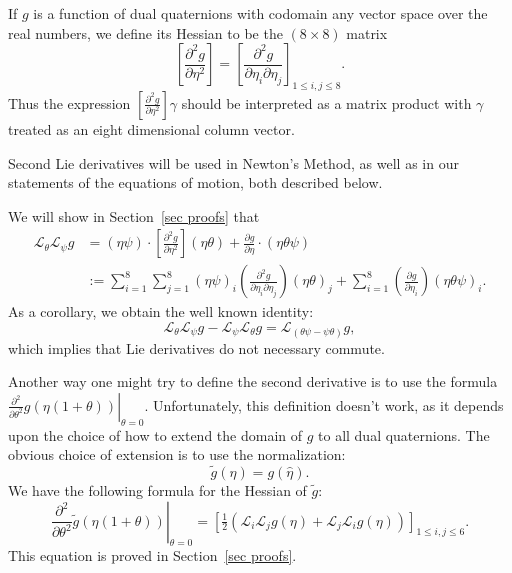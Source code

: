 \documentclass[reqno,12pt]{amsart}
\newcommand{\liederiv}{\mathcal L}
\begin{document}
If $g$ is a function of dual quaternions with codomain any vector space over the real numbers, we define its Hessian to be the $(8 \times 8)$ matrix
\begin{equation}
\left[\frac{\partial^2 g}{\partial \eta^2}\right] = \left[\frac{\partial^2 g}{\partial \eta_i\partial \eta_j}\right] _{ 1 \le i,j \le 8 }.
\end{equation}
Thus the expression $\left[\frac{\partial^2 g}{\partial \eta^2}\right] \gamma$ should be interpreted as a matrix product with $\gamma$ treated as an eight dimensional column vector.

Second Lie derivatives will be used in Newton's Method, as well as in our statements of the equations of motion, both described below.

We will show in Section~\ref{sec proofs} that
\begin{equation}
\label{second lie deriv}
\begin{aligned}
\liederiv_\theta \liederiv_\psi g &= (\eta \psi) \cdot \left[\frac{\partial^2 g}{\partial \eta^2}\right](\eta \theta) + \frac{\partial g}{\partial \eta} \cdot (\eta \theta \psi) \\
&:= \sum_{i=1}^8 \sum_{j=1}^8 (\eta \psi)_i \left(\frac{\partial^2 g}{\partial \eta_i \partial \eta_j}\right)(\eta \theta)_j + \sum_{i=1}^8 \left(\frac{\partial g}{\partial \eta_i}\right) (\eta \theta \psi)_i .
\end{aligned}
\end{equation}
As a corollary, we obtain the well known identity:
\begin{equation}
\label{lie bracket diff = diff lie bracket}
\liederiv_\theta \liederiv_\psi g - \liederiv_\psi \liederiv_\theta g = \liederiv_{(\theta\psi - \psi\theta)} g,
\end{equation}
which implies that Lie derivatives do not necessary commute.

Another way one might try to define the second derivative is to use the formula $\left.\frac {\partial^2}{\partial\theta^2} g(\eta(1+\theta)) \right | _{\theta=0}$.  Unfortunately, this definition doesn't work, as it depends upon the choice of how to extend the domain of $g$ to all dual quaternions.  The obvious choice of extension is to use the normalization:
\begin{equation}
\tilde g(\eta) = g(\hat\eta) .
\end{equation}
We have the following formula for the Hessian of $\tilde g$:
\begin{equation}
\label{hessian}
\left.\frac{\partial^2}{\partial\theta^2} \tilde g(\eta(1+\theta)) \right|_{\theta = 0} = \left[\tfrac12 (\liederiv_i \liederiv_j g(\eta) + \liederiv_j \liederiv_i g(\eta)) \right]_{1\le i,j\le 6}.
\end{equation}
This equation is proved in Section~\ref{sec proofs}.
\end{document}
